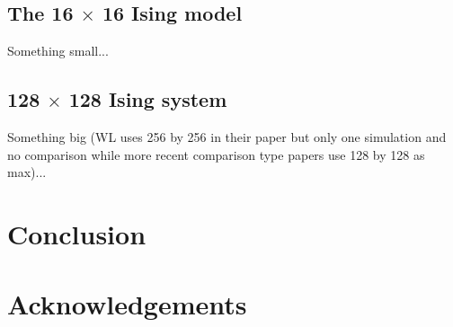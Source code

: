 \documentclass[letterpaper,twocolumn,amsmath,amssymb,pre,aps,10pt]{revtex4-1}
\begin{document}
\subsection{The 16 $\times$ 16 Ising model}
Something small...
\subsection{128 $\times$ 128 Ising system}
Something big (WL uses 256 by 256 in their paper but only one simulation and
no comparison while more recent comparison type papers use 128 by 128 as max)...

\section{Conclusion}

\section{Acknowledgements}

\end{document}
